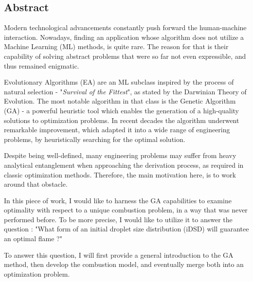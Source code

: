 \documentclass[12pt]{article}
\renewcommand{\baselinestretch}{1.2}
\numberwithin{equation}{section}
\begin{document}
\begin{flushleft} 
\begingroup
\hypersetup{linkcolor=black}
\renewcommand{\baselinestretch}{0.85}\normalsize
\tableofcontents 
\renewcommand{\baselinestretch}{1.0}\normalsize
\endgroup 				%
\newpage


\subsection*{Abstract}  
Modern technological advancements constantly push forward the human-machine interaction. Nowadays, finding an application whose algorithm does not utilize a Machine Learning (ML) methods, is quite rare. The reason for that is their capability of solving abstract problems that were so far not even expressible, and thus remained enigmatic. 

Evolutionary Algorithms (EA) are an ML subclass inspired by the process of natural selection - "\textit{Survival of the Fittest}", as stated by the Darwinian Theory of Evolution. The most notable algorithm in that class is the Genetic Algorithm (GA) - a powerful heuristic tool which enables the generation of a high-quality solutions to optimization problems. In recent decades the algorithm underwent remarkable improvement, which adapted it into a wide range of engineering problems, by heuristically searching for the optimal solution.

Despite being well-defined, many engineering problems may suffer from heavy analytical entanglement when approaching the derivation process, as required in classic optimization methods. Therefore, the main motivation here, is to work around that obstacle.

In this piece of work, I would like to harness the GA capabilities to examine optimality with respect to a unique combustion problem, in a way that was never performed before. To be more precise, I would like to utilize it to answer the question : "What form of an initial droplet size distribution (iDSD) will guarantee an optimal flame ?"

To answer this question, I will first provide a general introduction to the GA method, then develop the combustion model, and eventually merge both into an optimization problem.


\end{flushleft}
\end{document}
